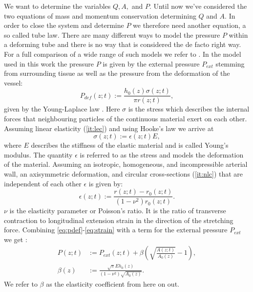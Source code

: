 \documentclass[a4paper, oneside]{discothesis}
\begin{document}
We want to determine the variables $Q, A,$ and $P$.
Until now we've considered the two equations of mass and momentum conservation determining $Q$ and $A$.
In order to close the system and determine $P$ we therefore need another equation, a so called tube law.
There are many different ways to model the pressure $P$ within a deforming tube and there is no way that is considered the de facto right way.
For a full comparison of a wide range of such models we refer to \cite{gomez2017analysis}.
In the model used in this work the pressure $P$ is given by the external pressure $P_{ext}$ stemming from surrounding tissue as well as the pressure from the deformation of the vessel:
\begin{equation}
	P_{def}(z;t) := \frac{h_0(z) \sigma(z;t)}{\pi r(z;t)}, \label{eq:pdef}
\end{equation}
given by the Young-Laplace law \cite{comte1799traite} \cite{thomas1805essay}.
Here $\sigma$ is the stress which describes the internal forces that neighbouring particles of the continuous material exert on each other.
Assuming linear elasticity (\autoref{it:lec}) and using Hooke's law \cite{hooke1678lectures} we arrive at
\begin{equation}
	\sigma(z;t) := \epsilon(z;t) E \label{eq:stress},
\end{equation}
where $E$ describes the stiffness of the elastic material and is called Young's modulus.
The quantity $\epsilon$ is referred to as the stress and models the deformation of the material.
Assuming an isotropic, homogeneous, and incompressible arterial wall, an axisymmetric deformation, and circular cross-sections (\autoref{it:nlc}) that are independent of each other $\epsilon$ is given by:
\begin{equation}
	\epsilon(z;t) := \frac{r(z;t)-r_0(z;t)}{ (1-\nu^2) r_0(z;t)}. \label{eq:strain}
\end{equation}
$\nu$ is the elasticity parameter or Poisson's ratio.
It is the ratio of transverse contraction to longitudinal extension strain in the direction of the stretching force.
Combining \autoref{eq:pdef}-\autoref{eq:strain} with a term for the external pressure $P_{ext}$ we get \cite{sherwin2003one} \cite{sherwin2003computational}: 
\begin{align}
	P(z;t) &:= P_{ext}(z;t) + \beta \left( \sqrt{\frac{A(z;t)}{A_0(z)}}-1 \right),  \label{eq:p_tot}\\
	\beta(z) &:=  \frac{\sqrt{\pi} E h_0(z)}{(1-\nu^2) \sqrt{A_0(z)}}.
\end{align}
We refer to $\beta$ as the elasticity coefficient from here on out.
\end{document}
